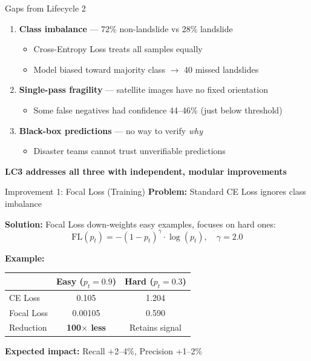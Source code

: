 \documentclass[aspectratio=169]{beamer}
\begin{document}
\begin{frame}{Gaps from Lifecycle 2}
    \begin{enumerate}
        \item \textbf{Class imbalance} --- 72\% non-landslide vs 28\% landslide
            \begin{itemize}
                \item Cross-Entropy Loss treats all samples equally
                \item Model biased toward majority class $\to$ 40 missed landslides
            \end{itemize}

        \item \textbf{Single-pass fragility} --- satellite images have no fixed orientation
            \begin{itemize}
                \item Some false negatives had confidence 44--46\% (just below threshold)
            \end{itemize}

        \item \textbf{Black-box predictions} --- no way to verify \textit{why}
            \begin{itemize}
                \item Disaster teams cannot trust unverifiable predictions
            \end{itemize}
    \end{enumerate}

    \vspace{0.3cm}
    \centering
    \textbf{LC3 addresses all three with independent, modular improvements}
\end{frame}

\begin{frame}{Improvement 1: Focal Loss (Training)}
    \textbf{Problem:} Standard CE Loss ignores class imbalance

    \textbf{Solution:} Focal Loss down-weights easy examples, focuses on hard ones:
    \[
    \text{FL}(p_t) = -(1 - p_t)^\gamma \cdot \log(p_t), \quad \gamma = 2.0
    \]

    \vspace{0.2cm}
    \textbf{Example:}
    \begin{table}
        \centering
        \small
        \begin{tabular}{lcc}
            \toprule
            & \textbf{Easy} ($p_t = 0.9$) & \textbf{Hard} ($p_t = 0.3$) \\
            \midrule
            CE Loss & 0.105 & 1.204 \\
            Focal Loss & 0.00105 & 0.590 \\
            \midrule
            Reduction & \textbf{100$\times$ less} & Retains signal \\
            \bottomrule
        \end{tabular}
    \end{table}

    \textbf{Expected impact:} Recall +2--4\%, Precision +1--2\%
\end{frame}
\end{document}
